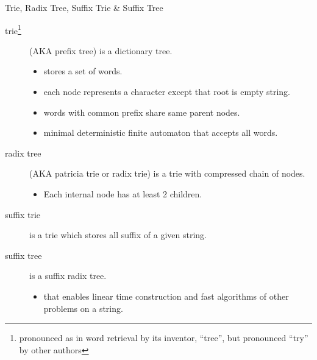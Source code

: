 \begin{frame}{Trie, Radix Tree, Suffix Trie \& Suffix Tree}
\begin{description}
\item[trie\footnote{pronounced as in word re\alert{trie}val by its 
inventor,  ``tree'', but pronounced 
``try'' by other authors}] {\tiny (AKA prefix tree)} is a dictionary tree.
\begin{itemize}
\item stores a set of words.
\item each node represents a character {\tiny except that root is empty string}.
\item words with common prefix share same parent nodes.
\item minimal \alert{deterministic finite automaton} {\tiny that accepts all words}.
\end{itemize}
\item[radix tree]  {\tiny (AKA patricia trie or radix trie)} is a trie with 
compressed chain of nodes.
\begin{itemize}
\item Each internal node has at least 2 children.
\end{itemize}
\item[suffix trie] is a trie which stores all suffix of a given string.
\item[suffix tree] is a suffix radix tree.
\begin{itemize}
\item that enables \alert{linear time} construction and \alert{fast}
algorithms of other problems on a string.
\end{itemize}
\end{description}
\end{frame}
